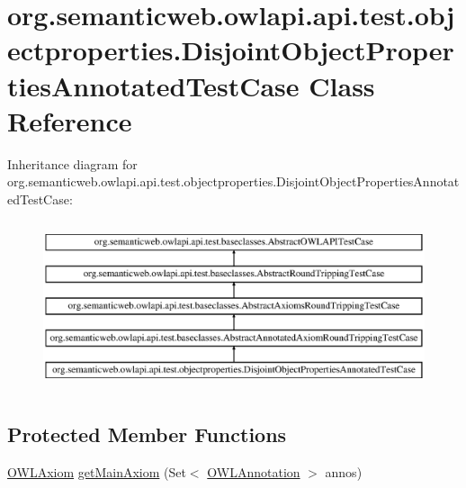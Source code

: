\hypertarget{classorg_1_1semanticweb_1_1owlapi_1_1api_1_1test_1_1objectproperties_1_1_disjoint_object_properties_annotated_test_case}{\section{org.\-semanticweb.\-owlapi.\-api.\-test.\-objectproperties.\-Disjoint\-Object\-Properties\-Annotated\-Test\-Case Class Reference}
\label{classorg_1_1semanticweb_1_1owlapi_1_1api_1_1test_1_1objectproperties_1_1_disjoint_object_properties_annotated_test_case}
}
Inheritance diagram for org.\-semanticweb.\-owlapi.\-api.\-test.\-objectproperties.\-Disjoint\-Object\-Properties\-Annotated\-Test\-Case\-:\begin{figure}[H]
\begin{center}
\leavevmode
\includegraphics[height=5.000000cm]{classorg_1_1semanticweb_1_1owlapi_1_1api_1_1test_1_1objectproperties_1_1_disjoint_object_properties_annotated_test_case}
\end{center}
\end{figure}
\subsection*{Protected Member Functions}
\begin{DoxyCompactItemize}
\item 
\hyperlink{interfaceorg_1_1semanticweb_1_1owlapi_1_1model_1_1_o_w_l_axiom}{O\-W\-L\-Axiom} \hyperlink{classorg_1_1semanticweb_1_1owlapi_1_1api_1_1test_1_1objectproperties_1_1_disjoint_object_properties_annotated_test_case_a2914376e128413115c6e556a632e764c}{get\-Main\-Axiom} (Set$<$ \hyperlink{interfaceorg_1_1semanticweb_1_1owlapi_1_1model_1_1_o_w_l_annotation}{O\-W\-L\-Annotation} $>$ annos)
\end{DoxyCompactItemize}

